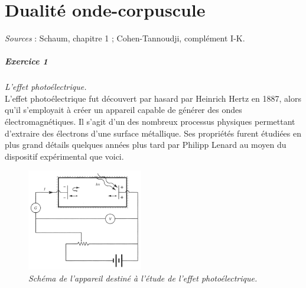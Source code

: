 
\chapter{Dualité onde-corpuscule}

\textit{Sources} : Schaum, chapitre 1 ; Cohen-Tannoudji, complément I-K.

\paragraph{Exercice 1} \textit{L'effet photoélectrique.} \\
L'effet photoélectrique fut découvert par hasard par Heinrich Hertz en 1887, alors qu'il s'employait à créer un appareil capable de générer des ondes électromagnétiques. Il s'agit d'un des nombreux processus physiques permettant d'extraire des électrons d'une surface métallique. Ses propriétés furent étudiées en plus grand détails quelques années plus tard par Philipp Lenard au moyen du dispositif expérimental que voici.
 
\begin{figure}[h!]
\begin{center}
\includegraphics[width=0.45\textwidth]{Pictures/Photoelectrique.PNG}
\end{center}
\caption{\textit{Schéma de l'appareil destiné à l'étude de l'effet photoélectrique.}}
\end{figure}

